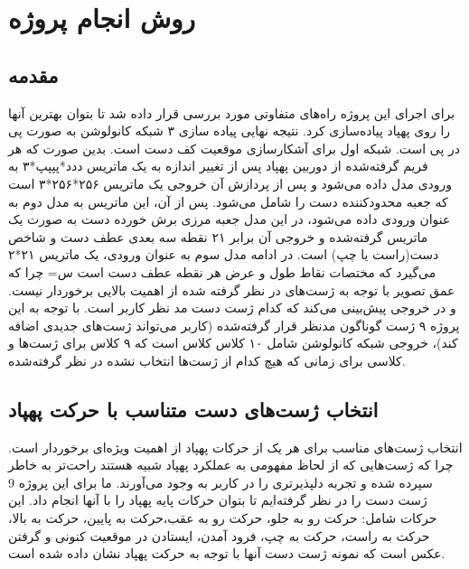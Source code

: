\chapter{روش انجام پروژه}
\section{مقدمه}

برای اجرای این پروژه راه‌های متفاوتی مورد بررسی قرار داده شد تا بتوان بهترین آنها را روی پهپاد پیاده‌سازی کرد. نتیجه نهایی پیاده سازی ۳ شبکه کانولوشن
به صورت پی در پی است. شبکه اول برای آشکارسازی موقعیت کف دست است. بدین صورت که هر فریم گرفته‌شده از دوربین پهپاد 
پس از تغییر اندازه به یک ماتریس ددد*پپپپ*۳ به ورودی مدل داده می‌شود و پس از پردازش آن خروجی یک ماتریس ۲۵۶*۲۵۶*۳ است که جعبه محدودکننده 
دست را شامل می‌شود. پس از آن، این ماتریس به مدل دوم به عنوان ورودی داده می‌شود، در این مدل جعبه مرزی برش خورده دست به صورت یک ماتریس گرفته‌شده و خروجی آن برابر ۲۱ نقطه 
سه بعدی عطف دست و شاخص دست(راست یا چپ) است.  در ادامه مدل سوم به عنوان ورودی، یک ماتریس ۲۱*۲ می‌گیرد که مختصات نقاط  طول و عرض هر نقطه عطف دست است س=
چرا که عمق تصویر با توجه به ژست‌های در نظر گرفته شده از اهمیت بالایی برخوردار نیست. و در خروجی پیش‌بینی می‌کند که کدام ژست دست مد نظر کاربر است. با توجه به این پروژه ۹ ژست 
گوناگون مدنظر قرار گرفته‌شده (کاربر می‌تواند ژست‌های جدیدی اضافه کند)، خروجی شبکه کانولوشن شامل ۱۰ کلاس 
کلاس است که ۹ کلاس برای ژست‌ها و کلاسی برای زمانی که هیچ کدام از ژست‌ها انتخاب نشده در نظر گرفته‌شده.


\section{انتخاب ژست‌های دست متناسب با حرکت پهپاد}
انتخاب ژست‌های مناسب برای هر یک از حرکات پهپاد از اهمیت ویژه‌ای برخوردار است. چرا که ژست‌هایی که از لحاظ مفهومی به عملکرد پهپاد شبیه هستند راحت‌تر به خاطر سپرده شده و تجربه دلپذیرتری را در کاربر به وجود می‌آورند. 
ما برای این پروژه 9 ژست دست را در نظر گرفته‌ایم تا بتوان حرکات پایه پهپاد را با آنها انجام داد. این حرکات شامل: حرکت رو به جلو،  حرکت رو به عقب،حرکت به پایین، حرکت به بالا، حرکت به راست، حرکت به چپ، فرود آمدن، 
ایستادن در موقعیت کنونی و گرفتن عکس است که نمونه ژست دست آنها با توجه به حرکت پهپاد نشان داده شده است.

